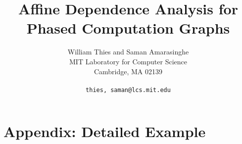 \documentclass[10pt]{article}
\title{Affine Dependence Analysis for Phased Computation Graphs}
\author{William Thies and Saman Amarasinghe \\
  MIT Laboratory for Computer Science\\
  Cambridge, MA  02139\\ \\
  \texttt{\symbol{`\{}thies, saman\symbol{`\}}@lcs.mit.edu}}
\date{}
\begin{document}
  \maketitle

  \newcommand{\mt}[1]{\mbox{\it #1}}
  \newcommand{\todo}[1]{\framebox{#1}}
  \newcommand{\dep}[0]{Dependence Frontier}                %
  \newcommand{\DP}[0]{\textsc{Frontier}}                   %
  \newcommand{\DEP}[2]{\DP_{#1 \small{\rightarrow} #2}}    %

  \begin{abstract}
    
  \end{abstract}

  

  \begin{small}
    \begin{singlespace}
      
      
    \end{singlespace}
  \end{small}
  
  \section{Appendix: Detailed Example}
  
\end{document}
